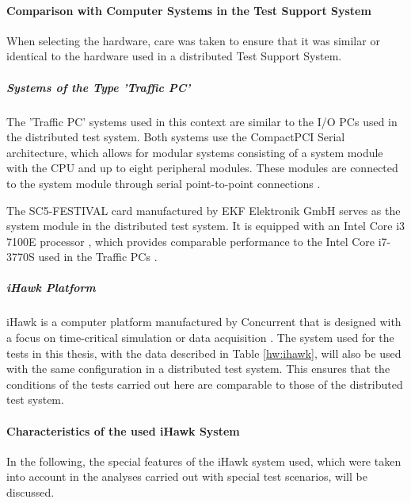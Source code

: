 \paragraph{Comparison with Computer Systems in the Test Support System}
When selecting the hardware, care was taken to ensure that it was similar or identical to the hardware used in a distributed Test Support System.

\subparagraph{Systems of the Type 'Traffic PC'}
The 'Traffic PC' systems used in this context are similar to the I/O PCs used in the distributed test system. Both systems use the CompactPCI Serial architecture, which allows for modular systems consisting of a system module with the CPU and up to eight peripheral modules. These modules are connected to the system module through serial point-to-point connections \cite{setup01}.

The SC5-FESTIVAL card manufactured by EKF Elektronik GmbH serves as the system module in the distributed test system. It is equipped with an Intel Core i3 7100E processor \cite{setup02}, which provides comparable performance to the Intel Core i7-3770S used in the Traffic PCs \cite{setup03}.

\subparagraph{iHawk Platform}
iHawk is a computer platform manufactured by Concurrent that is designed with a focus on time-critical simulation or data acquisition \cite{setup04}. The system used for the tests in this thesis, with the data described in Table \ref{hw:ihawk}, will also be used with the same configuration in a distributed test system. This ensures that the conditions of the tests carried out here are comparable to those of the distributed test system.


\paragraph{Characteristics of the used iHawk System} \label{chap:iHawkChar}
In the following, the special features of the iHawk system used, which were taken into account in the analyses carried out with special test scenarios, will be discussed.

